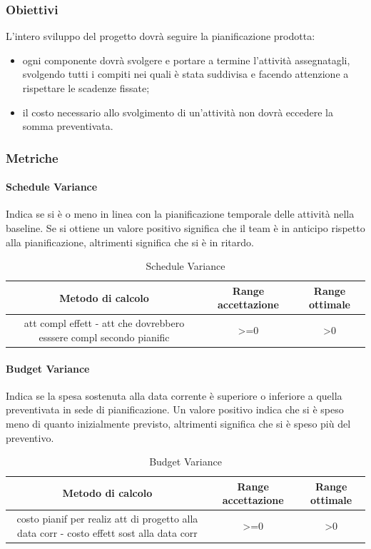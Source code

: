 		\subsubsection{Obiettivi}
		L’intero sviluppo del progetto dovrà seguire la pianificazione prodotta:
		\begin{itemize}
			\item ogni componente dovrà svolgere e portare a termine l'attività assegnatagli, svolgendo tutti i compiti nei quali è stata suddivisa e facendo attenzione a rispettare le scadenze fissate;
			\item il costo necessario allo svolgimento di un'attività non dovrà eccedere la somma
			preventivata.
		\end{itemize}
		\subsubsection{Metriche}
			\paragraph{Schedule Variance}
			Indica se si è o meno in linea con la pianificazione temporale delle attività nella baseline.
			Se si ottiene un valore positivo significa che il team è in anticipo rispetto alla pianificazione, altrimenti significa che si è in ritardo.
			\begin{table}[H]
				\begin{center}
					\begin{tabular}{|c|c|c|}
						\hline
						\textbf{Metodo di calcolo} & \textbf{Range accettazione} & \textbf{Range ottimale} \\
						\hline
						att compl effett - att che dovrebbero esssere compl secondo pianific  & >=0  & >0 \\
						\hline
					\end{tabular}
				\end{center}
				\caption{Schedule Variance}
			\end{table}
		
		\paragraph{Budget Variance}
		Indica se la spesa sostenuta alla data corrente è superiore o inferiore a quella preventivata in sede di pianificazione.
		Un valore positivo indica che si è speso meno di quanto inizialmente previsto, altrimenti significa che si è speso più del preventivo.
		\begin{table}[H]
			\begin{center}
				\begin{tabular}{|c|c|c|}
					\hline
					\textbf{Metodo di calcolo} & \textbf{Range accettazione} & \textbf{Range ottimale} \\
					\hline
					costo pianif per realiz att di progetto alla data corr - costo effett sost alla data corr & >=0  & >0 \\
					\hline
				\end{tabular}
			\end{center}
			\caption{Budget Variance}
		\end{table}
	

